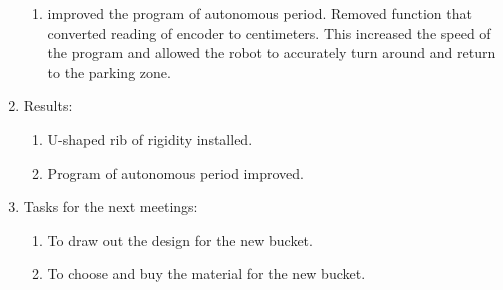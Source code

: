 \begin{enumerate}
\begin{enumerate}
		\item improved the program of autonomous period. Removed function that converted reading of encoder to centimeters. This increased the speed of the program and allowed the robot to accurately turn around and return to the parking zone.	  
		
	\end{enumerate}
	
	\item Results:  
	\begin{enumerate}
		\item U-shaped rib of rigidity installed.
		
		\item Program of autonomous period improved.
		
	\end{enumerate}
	
	\item Tasks for the next meetings:
	\begin{enumerate}
		\item To draw out the design for the new bucket.
		
		\item To choose and buy the material for the new bucket.
		
	\end{enumerate}     
\end{enumerate}
\fillpage